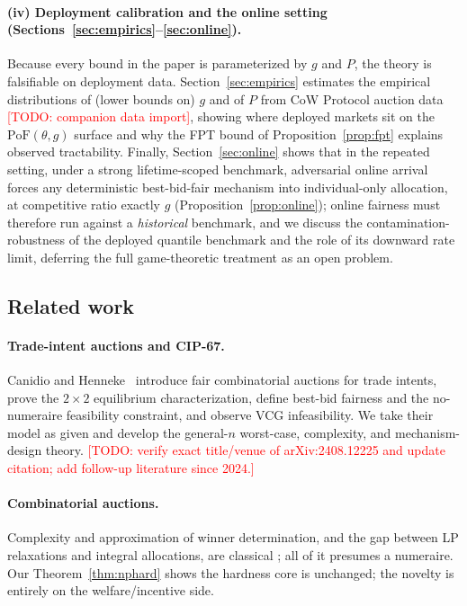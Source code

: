 \documentclass[11pt]{article}
\newcommand{\todo}[1]{\textcolor{red}{[TODO: #1]}}
\theoremstyle{remark}
\newcommand{\PoF}{\mathrm{PoF}}
\begin{document}
\paragraph{(iv) Deployment calibration and the online setting
(Sections~\ref{sec:empirics}--\ref{sec:online}).}
Because every bound in the paper is parameterized by $g$ and $P$, the theory
is falsifiable on deployment data. Section~\ref{sec:empirics} estimates the
empirical distributions of (lower bounds on) $g$ and of $P$ from CoW
Protocol auction data \todo{companion data import}, showing where deployed
markets sit on the $\PoF(\theta,g)$ surface and why the FPT bound of
Proposition~\ref{prop:fpt} explains observed tractability. Finally,
Section~\ref{sec:online} shows that in the repeated setting, under a
strong lifetime-scoped benchmark, adversarial online arrival forces any
deterministic best-bid-fair mechanism into individual-only allocation, at
competitive ratio exactly $g$
(Proposition~\ref{prop:online}); online fairness must therefore run against
a \emph{historical} benchmark, and we discuss the contamination-robustness
of the deployed quantile benchmark and the role of its downward rate limit,
deferring the full game-theoretic treatment as an open problem.

\subsection{Related work}\label{sec:related}

\paragraph{Trade-intent auctions and CIP-67.}
Canidio and Henneke~\cite{canidio2024} introduce fair combinatorial
auctions for trade intents, prove the $2\times2$ equilibrium
characterization, define best-bid fairness and the no-numeraire feasibility
constraint, and observe VCG infeasibility. We take their model as given and
develop the general-$n$ worst-case, complexity, and mechanism-design theory.
\todo{verify exact title/venue of arXiv:2408.12225 and update citation;
add follow-up literature since 2024.}

\paragraph{Combinatorial auctions.}
Complexity and approximation of winner determination, and the gap between
LP relaxations and integral allocations, are classical
\cite{nisan2006,lehmann2002,bikhchandani2002}; all of it presumes a
numeraire. Our Theorem~\ref{thm:nphard} shows the hardness core is
unchanged; the novelty is entirely on the welfare/incentive side.
\end{document}

